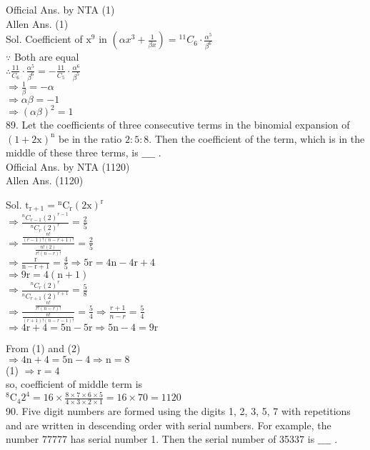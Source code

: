 \documentclass[10pt]{article}
\begin{document}
Official Ans. by NTA (1)\\
Allen Ans. (1)\\
Sol. Coefficient of \(\mathrm{x}^{9}\) in \(\left(\alpha x^{3}+\frac{1}{\beta x}\right)={ }^{11} C_{6} \cdot \frac{\alpha^{5}}{\beta^{6}}\)\\
\(\because\) Both are equal\\
\(\therefore \frac{11}{C_{6}} \cdot \frac{\alpha^{5}}{\beta^{6}}=-\frac{11}{C_{5}} \cdot \frac{\alpha^{6}}{\beta^{5}}\)\\
\(\Rightarrow \frac{1}{\beta}=-\alpha\)\\
\(\Rightarrow \alpha \beta=-1\)\\
\(\Rightarrow(\alpha \beta)^{2}=1\)\\
89. Let the coefficients of three consecutive terms in the binomial expansion of \((1+2 \mathrm{x})^{\mathrm{n}}\) be in the ratio \(2: 5: 8\). Then the coefficient of the term, which is in the middle of these three terms, is \(\_\_\_\_\) .\\
Official Ans. by NTA (1120)\\
Allen Ans. (1120)

Sol. \(\mathrm{t}_{\mathrm{r}+1}={ }^{\mathrm{n}} \mathrm{C}_{\mathrm{r}}(2 \mathrm{x})^{\mathrm{r}}\)\\
\(\Rightarrow \frac{{ }^{n} C_{r-1}(2)^{r-1}}{{ }^{n} C_{r}(2)^{r}}=\frac{2}{5}\)\\
\(\Rightarrow \frac{\frac{n!}{(r-1)!(n-r+1)!}}{\frac{n!(2)}{r!(n-r)!}}=\frac{2}{5}\)\\
\(\Rightarrow \frac{\mathrm{r}}{\mathrm{n}-\mathrm{r}+1}=\frac{4}{5} \Rightarrow 5 \mathrm{r}=4 \mathrm{n}-4 \mathrm{r}+4\)\\
\(\Rightarrow 9 \mathrm{r}=4(\mathrm{n}+1)\)\\
\(\Rightarrow \frac{{ }^{n} C_{r}(2)^{r}}{{ }^{n} C_{r+1}(2)^{r+1}}=\frac{5}{8}\)\\
\(\Rightarrow \frac{\frac{n!}{r!(n-r)!}}{\frac{n!}{(r+1)!(n-r-1)!}}=\frac{5}{4} \Rightarrow \frac{r+1}{n-r}=\frac{5}{4}\)\\
\(\Rightarrow 4 \mathrm{r}+4=5 \mathrm{n}-5 \mathrm{r} \Rightarrow 5 \mathrm{n}-4=9 \mathrm{r}\)

From (1) and (2)\\
\(\Rightarrow 4 \mathrm{n}+4=5 \mathrm{n}-4 \Rightarrow \mathrm{n}=8\)\\
(1) \(\Rightarrow \mathrm{r}=4\)\\
so, coefficient of middle term is\\
\({ }^{8} \mathrm{C}_{4} 2^{4}=16 \times \frac{8 \times 7 \times 6 \times 5}{4 \times 3 \times 2 \times 1}=16 \times 70=1120\)\\
90. Five digit numbers are formed using the digits 1, 2, 3, 5, 7 with repetitions and are written in descending order with serial numbers. For example, the number 77777 has serial number 1. Then the serial number of 35337 is \(\_\_\_\_\) .
\end{document}
